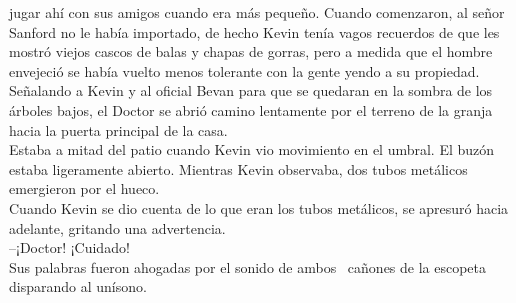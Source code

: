 jugar ahí con sus amigos cuando era más pequeño. Cuando comenzaron, al
señor Sanford no le había importado, de hecho Kevin tenía vagos
recuerdos de que les mostró viejos cascos de balas y chapas de gorras,
pero a medida que el hombre envejeció se había vuelto menos tolerante
con la gente yendo a su propiedad.\\
Señalando a Kevin y al oficial Bevan para que se quedaran en la sombra
de los árboles bajos, el Doctor se abrió camino lentamente por el
terreno de la granja hacia la puerta principal de la casa.\\
Estaba a mitad del patio cuando Kevin vio movimiento en el umbral. El
buzón estaba ligeramente abierto. Mientras Kevin observaba, dos tubos
metálicos emergieron por el hueco.\\
Cuando Kevin se dio cuenta de lo que eran los tubos metálicos, se
apresuró hacia adelante, gritando una advertencia.\\
--¡Doctor! ¡Cuidado!\\
Sus palabras fueron ahogadas por el sonido de ambos ~cañones de la
escopeta disparando al unísono.\\
